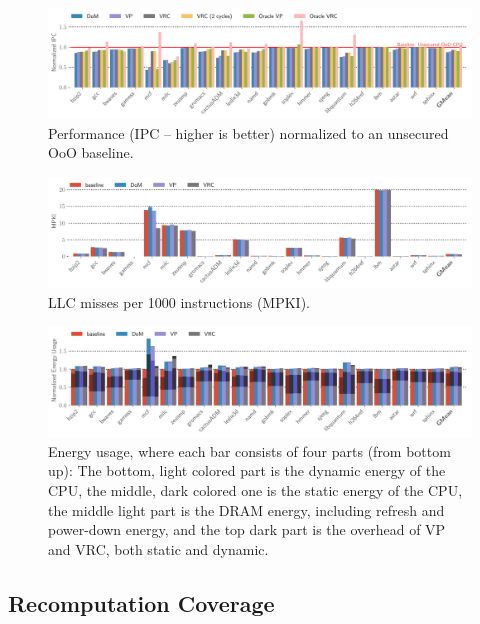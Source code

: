 \begin{figure}[t]
  \includegraphics[width=\textwidth]{figs/normalized_ipc_all.pdf}
  \caption{Performance (IPC -- higher is better) normalized to an unsecured OoO baseline.}
  \label{fig:ipc}
\end{figure}


\begin{figure}[t]
  \includegraphics[width=\textwidth]{figs/mpki.pdf}
  \caption{LLC misses per 1000 instructions (MPKI).}
  \label{fig:mpki}
\end{figure}

\begin{figure}[t]
  \includegraphics[width=\textwidth]{figs/normalized_energy_usage.pdf}
  \caption{Energy usage, where each bar consists of four parts (from bottom up): The bottom, light colored part is the dynamic energy of the CPU, the middle, dark colored one is the static energy of the CPU, the middle light part is the DRAM energy, including refresh and power-down energy, and the top dark part is the overhead of VP and VRC, both static and dynamic.
  }
  \label{fig:energy}
\end{figure}


\subsection{Recomputation Coverage}
\label{sec:coverage}


